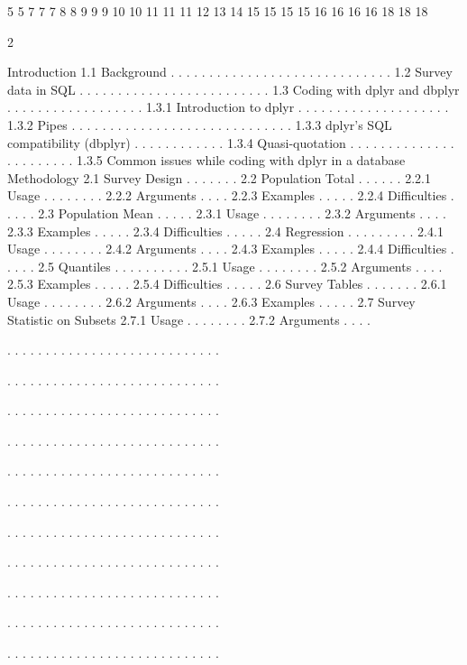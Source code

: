 5
5
7
7
7
8
8
9
9
9
10
10
11
11
11
12
13
14
15
15
15
15
16
16
16
16
18
18
18

2

Introduction
1.1 Background . . . . . . . . . . . . . . . . . . . . . . . . . . . . .
1.2 Survey data in SQL . . . . . . . . . . . . . . . . . . . . . . . . .
1.3 Coding with dplyr and dbplyr . . . . . . . . . . . . . . . . . .
1.3.1 Introduction to dplyr . . . . . . . . . . . . . . . . . . . .
1.3.2 Pipes . . . . . . . . . . . . . . . . . . . . . . . . . . . . .
1.3.3 dplyr’s SQL compatibility (dbplyr) . . . . . . . . . . . .
1.3.4 Quasi-quotation . . . . . . . . . . . . . . . . . . . . . . .
1.3.5 Common issues while coding with dplyr in a database
Methodology
2.1 Survey Design . . . . . . .
2.2 Population Total . . . . . .
2.2.1 Usage . . . . . . . .
2.2.2 Arguments . . . .
2.2.3 Examples . . . . .
2.2.4 Difficulties . . . . .
2.3 Population Mean . . . . .
2.3.1 Usage . . . . . . . .
2.3.2 Arguments . . . .
2.3.3 Examples . . . . .
2.3.4 Difficulties . . . . .
2.4 Regression . . . . . . . . .
2.4.1 Usage . . . . . . . .
2.4.2 Arguments . . . .
2.4.3 Examples . . . . .
2.4.4 Difficulties . . . . .
2.5 Quantiles . . . . . . . . . .
2.5.1 Usage . . . . . . . .
2.5.2 Arguments . . . .
2.5.3 Examples . . . . .
2.5.4 Difficulties . . . . .
2.6 Survey Tables . . . . . . .
2.6.1 Usage . . . . . . . .
2.6.2 Arguments . . . .
2.6.3 Examples . . . . .
2.7 Survey Statistic on Subsets
2.7.1 Usage . . . . . . . .
2.7.2 Arguments . . . .

.
.
.
.
.
.
.
.
.
.
.
.
.
.
.
.
.
.
.
.
.
.
.
.
.
.
.
.

.
.
.
.
.
.
.
.
.
.
.
.
.
.
.
.
.
.
.
.
.
.
.
.
.
.
.
.

.
.
.
.
.
.
.
.
.
.
.
.
.
.
.
.
.
.
.
.
.
.
.
.
.
.
.
.

.
.
.
.
.
.
.
.
.
.
.
.
.
.
.
.
.
.
.
.
.
.
.
.
.
.
.
.

.
.
.
.
.
.
.
.
.
.
.
.
.
.
.
.
.
.
.
.
.
.
.
.
.
.
.
.

.
.
.
.
.
.
.
.
.
.
.
.
.
.
.
.
.
.
.
.
.
.
.
.
.
.
.
.

.
.
.
.
.
.
.
.
.
.
.
.
.
.
.
.
.
.
.
.
.
.
.
.
.
.
.
.

.
.
.
.
.
.
.
.
.
.
.
.
.
.
.
.
.
.
.
.
.
.
.
.
.
.
.
.

.
.
.
.
.
.
.
.
.
.
.
.
.
.
.
.
.
.
.
.
.
.
.
.
.
.
.
.

.
.
.
.
.
.
.
.
.
.
.
.
.
.
.
.
.
.
.
.
.
.
.
.
.
.
.
.

.
.
.
.
.
.
.
.
.
.
.
.
.
.
.
.
.
.
.
.
.
.
.
.
.
.
.
.

